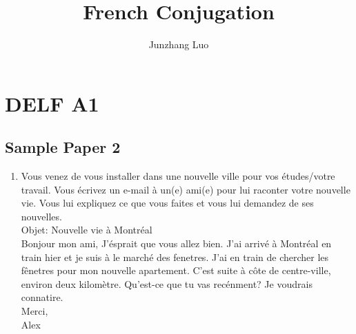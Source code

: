 \documentclass{book}
\title{French Conjugation}
\author{Junzhang Luo}
\begin{document}
\tableofcontents

\chapter{DELF A1}

    \section{Sample Paper 2}

        \begin{enumerate}
            \item Vous venez de vous installer dans une nouvelle ville pour vos études/votre travail. Vous écrivez un e-mail à un(e) ami(e) pour lui raconter votre nouvelle vie.
                    Vous lui expliquez ce que vous faites et vous lui demandez de ses nouvelles. \\
                    Objet: Nouvelle vie à Montréal \\
                    Bonjour mon ami, 
                    J'ésprait que vous allez bien. J'ai arrivé à Montréal en train hier et je suis à le marché des fenetres. J'ai en train de chercher les fênetres pour mon nouvelle apartement. 
                    C'est suite à côte de centre-ville, environ deux kilomètre. Qu'est-ce que tu vas recénment? Je voudrais connatire. \\
                    Merci,\\
                    Alex 


\end{enumerate}
\end{document}
